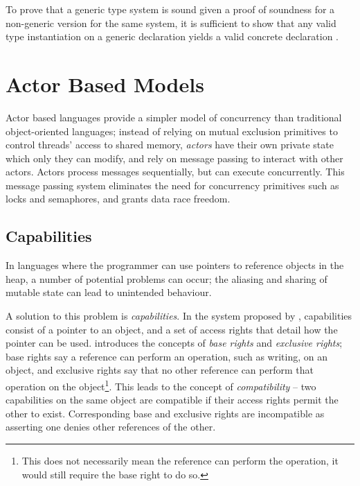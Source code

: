 To prove that a generic type system is sound given a proof of soundness for a non-generic version for the same system, it is sufficient to show that any valid type instantiation on a generic declaration yields a valid concrete declaration \cite{Gordon2012} .


\section{Actor Based Models}

Actor based languages \cite{Hewitt1973} provide a simpler model of concurrency than traditional object-oriented languages; instead of relying on mutual exclusion primitives to control threads' access to shared memory, \textit{actors} have their own private state which only they can modify, and rely on message passing to interact with other actors. Actors process messages sequentially, but can execute concurrently. This message passing system eliminates the need for concurrency primitives such as locks and semaphores, and grants data race freedom.

\subsection{Capabilities}

In languages where the programmer can use pointers to reference objects in the heap, a number of potential problems can occur; the aliasing and sharing of mutable state can lead to unintended behaviour.

A solution to this problem is \textit{capabilities}. In the system proposed by \cite{Boyland2001}, capabilities consist of a pointer to an object, and a set of access rights that detail how the pointer can be used. \cite{Boyland2001} introduces the concepts of \textit{base rights} and \textit{exclusive rights}; base rights say a reference can perform an operation, such as writing, on an object, and exclusive rights say that no other reference can perform that operation on the object\footnote{This does not necessarily mean the reference can perform the operation, it would still require the base right to do so.}. This leads to the concept of \textit{compatibility} -- two capabilities on the same object are compatible if their access rights permit the other to exist. Corresponding base and exclusive rights are incompatible as asserting one denies other references of the other.


